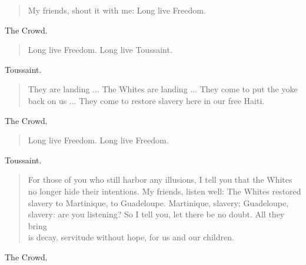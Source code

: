 \documentclass[letterpaper,article,12pt,oneside,notitlepage]{memoir}
\begin{document}
\begin{verse}
\hspace{1cm} My friends, shout it with me: Long live Freedom. \\
\end{verse}

\begin{center}The Crowd.\end{center}

\begin{verse}
\hspace{1cm} Long live Freedom. Long live Toussaint. \\
\end{verse}

\begin{center}Toussaint.\end{center}

\begin{verse}
\indent They are landing ... The Whites are landing ... They come to put the yoke back on us ... They come to restore slavery here in our free Haiti. \\
\end{verse}

\begin{center}The Crowd.\end{center}

\begin{verse}
\hspace{1cm} Long live Freedom. Long live Freedom. \\
\end{verse}

\clearpage

\begin{center}Toussaint.\end{center}

\begin{verse}
\indent For those of you who still harbor any illusions, I tell you that the Whites no longer hide their intentions. My friends, listen well: The Whites restored slavery to Martinique, to Guadeloupe. Martinique, slavery; Guadeloupe, slavery: are you listening? So I tell you, let there be no doubt. All they bring \\
\indent is decay, servitude without hope, for us and our children. \\
\end{verse}

\begin{center}The Crowd.\end{center}
\end{document}
